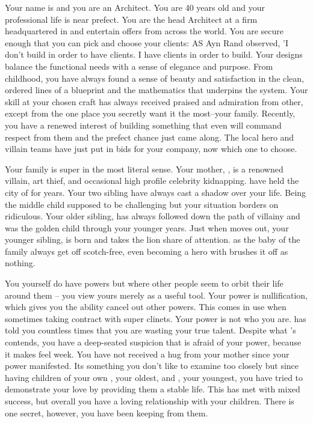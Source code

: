 \documentclass[char]{LRSguildcamp1}
\begin{document}
\name{\cArchitect{}}


Your name is \cArchitect{} and you are an Architect. You are 40 years old and your professional life is near prefect. You are the head Architect at a firm headquartered in  and entertain offers from across the world.  You are secure enough that you can pick and choose your clients: AS Ayn Rand observed, 'I don't build in order to have clients. I have clients in order to build. Your designs balance the functional needs with a sense of elegance and purpose. From childhood, you have always found a sense of beauty and satisfaction in the clean, ordered lines of a blueprint and the mathematics that underpins the system. Your skill at your chosen craft has always received praised and admiration from other, except from the one place you secretly want it the most--your family. Recently, you have a renewed interest of building something that even will command respect from them and the prefect chance just came along. The local hero and villain teams have just put in bids for your company, now which one to choose.

Your family is super in the most literal sense. Your mother, \cGrandma{}, is a renowned villain, art thief, and occasional high profile celebrity kidnapping. \cGrandma{\they} have held the city of  for years. Your two sibling have always cast a shadow over your life. Being the middle child supposed to be challenging but your situation borders on ridiculous. Your older sibling, \cOldest{} has always followed \cGrandma{} down the path of villainy and was the golden child through your younger years. Just when \cOldest{} moves out, your younger sibling, \cYoungest{} is born and takes the lion share of attention.  as the baby of the family always get off scotch-free, even becoming a hero with \cGrandma{} brushes it off as nothing.

You yourself do have powers but where other people seem to orbit their life around them -- you view yours merely as a useful tool. Your power is nullification, which gives you the ability cancel out other powers. This comes in use when sometimes taking contract with super clinets. Your power is not who you are. \cGrandma{} has told you countless times that you are wasting your true talent.  Despite what \cGrandma{} 's contends, you have a deep-seated suspicion that \cGrandma{\they} is afraid of your power, because it makes \cGrandma{\them} feel week. You have not received a hug from your mother since your power manifested. Its something you don't like to examine too closely but since having children of your own \cTeen{}, your oldest, and \cTween{}, your youngest, you have tried to demonstrate your love by providing them a stable life. This has met with mixed success, but overall you have a loving relationship with your children.  There is one secret, however, you have been keeping from them. 
\end{document}
